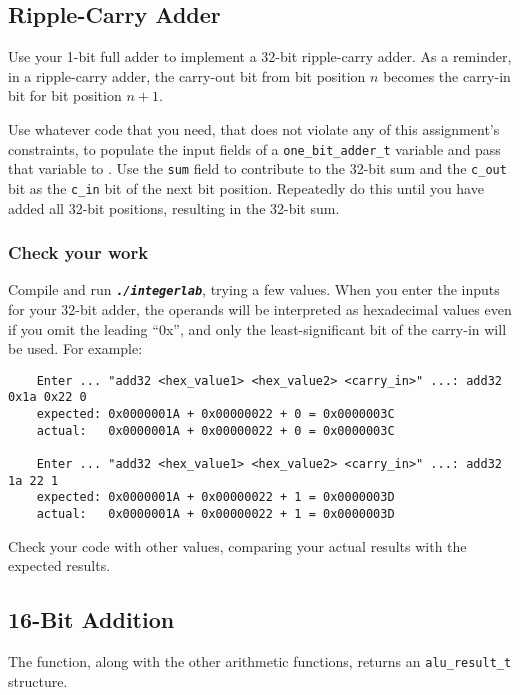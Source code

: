 \subsection{Ripple-Carry Adder} \label{subsec:ripple-carry-adder}

Use your 1-bit full adder to implement a 32-bit ripple-carry adder.
As a reminder, in a ripple-carry adder, the carry-out bit from bit position $n$ becomes the carry-in bit for bit position $n+1$.

Use whatever code that you need, that does not violate any of this assignment's constraints, to populate the input fields of a \lstinline{one_bit_adder_t} variable and pass that variable to .
Use the \lstinline{sum} field to contribute to the 32-bit sum and the \lstinline{c_out} bit as the \lstinline{c_in} bit of the next bit position.
Repeatedly do this until you have added all 32-bit positions, resulting in the 32-bit sum.

\subsubsection*{Check your work}

Compile and run \texttt{\textbf{\textit{./integerlab}}}, trying a few values.
When you enter the inputs for your 32-bit adder, the operands will be interpreted as hexadecimal values even if you omit the leading ``0x'', and only the least-significant bit of the carry-in will be used.
For example:
\begin{verbatim}
    Enter ... "add32 <hex_value1> <hex_value2> <carry_in>" ...: add32 0x1a 0x22 0
    expected: 0x0000001A + 0x00000022 + 0 = 0x0000003C
    actual:   0x0000001A + 0x00000022 + 0 = 0x0000003C

    Enter ... "add32 <hex_value1> <hex_value2> <carry_in>" ...: add32 1a 22 1
    expected: 0x0000001A + 0x00000022 + 1 = 0x0000003D
    actual:   0x0000001A + 0x00000022 + 1 = 0x0000003D
\end{verbatim}

Check your code with other values, comparing your actual results with the expected results.


\subsection{16-Bit Addition}

The  function, along with the other arithmetic functions, returns an \lstinline{alu_result_t} structure.

